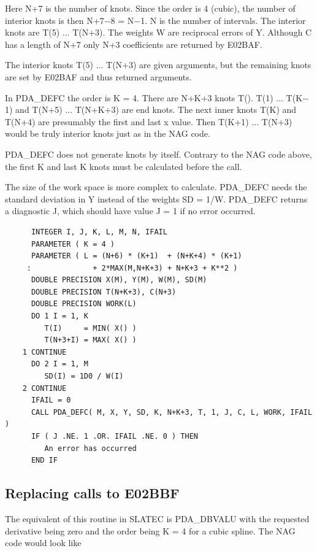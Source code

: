 \documentclass[11pt,twoside]{article}
\newcommand{\htmlref}[2]{#1}
\newcommand{\xlabel}[1]{}
\begin{document}
   Here N+7 is the number of knots. Since the order is 4 (cubic), the
   number of interior knots is then N+7$-$8 = N$-$1. N is the number of
   intervals. The interior knots are T(5) ... T(N+3). The weights W are
   reciprocal errors of Y. Although C has a length of N+7 only N+3
   coefficients are returned by E02BAF.

   The interior knots T(5) ... T(N+3) are given arguments, but the
   remaining knots are set by E02BAF and thus returned arguments.

   In PDA\_DEFC the order is K = 4. There are N+K+3 knots T(). T(1) ...
   T(K$-$1) and T(N+5) ... T(N+K+3) are end knots. The next
   inner knots T(K) and T(N+4) are presumably the first and last x
   value. Then T(K+1) ... T(N+3) would be truly interior knots just as
   in the NAG code.

   PDA\_DEFC does not generate knots by itself. Contrary to the NAG code
   above, the first K and last K knots must be calculated before the
   call.

   The size of the work space is more complex to calculate. PDA\_DEFC needs
   the standard deviation in Y instead of the weights SD = 1/W. PDA\_DEFC
   returns a diagnostic J, which should have value J = 1 if no error
   occurred.

\begin{verbatim}
      INTEGER I, J, K, L, M, N, IFAIL
      PARAMETER ( K = 4 )
      PARAMETER ( L = (N+6) * (K+1)  + (N+K+4) * (K+1)
     :              + 2*MAX(M,N+K+3) + N+K+3 + K**2 )
      DOUBLE PRECISION X(M), Y(M), W(M), SD(M)
      DOUBLE PRECISION T(N+K+3), C(N+3)
      DOUBLE PRECISION WORK(L)
      DO 1 I = 1, K
         T(I)     = MIN( X() )
         T(N+3+I) = MAX( X() )
    1 CONTINUE
      DO 2 I = 1, M
         SD(I) = 1D0 / W(I)
    2 CONTINUE
      IFAIL = 0
      CALL PDA_DEFC( M, X, Y, SD, K, N+K+3, T, 1, J, C, L, WORK, IFAIL )
      IF ( J .NE. 1 .OR. IFAIL .NE. 0 ) THEN
         An error has occurred
      END IF
\end{verbatim}


\subsection{\xlabel{replacing_calls_to_e02bbf}Replacing calls to E02BBF}

   The equivalent of this routine in SLATEC is
\htmlref{PDA\_DBVALU}{PDA\_DBVALU}
   with the requested
   derivative being zero and the order being K = 4 for a cubic spline.
   The NAG code would look like
\end{document}
